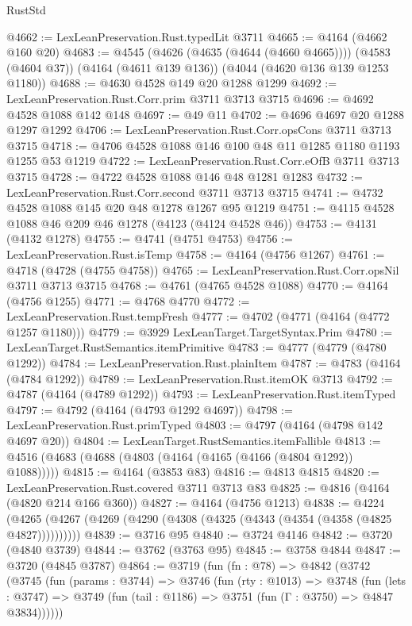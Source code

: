 \begin{lexlean}{RustStd}
\begin{coremodule}
@4662 := LexLeanPreservation.Rust.typedLit @3711
@4665 := @4164 (@4662 @160 @20)
@4683 := @4545
    (@4626 (@4635 (@4644 (@4660 @4665))))
    (@4583 (@4604 @37))
    (@4164 (@4611 @139 @136))
    (@4044 (@4620 @136 @139 @1253 @1180))
@4688 := @4630 @4528 @149 @20 @1288 @1299
@4692 := LexLeanPreservation.Rust.Corr.prim @3711 @3713 @3715
@4696 := @4692 @4528 @1088 @142 @148
@4697 := @49 @11
@4702 := @4696 @4697 @20 @1288 @1297 @1292
@4706 := LexLeanPreservation.Rust.Corr.opsCons @3711 @3713 @3715
@4718 := @4706 @4528 @1088 @146 @100 @48 @11 @1285 @1180 @1193 @1255 @53 @1219
@4722 := LexLeanPreservation.Rust.Corr.eOfB @3711 @3713 @3715
@4728 := @4722 @4528 @1088 @146 @48 @1281 @1283
@4732 := LexLeanPreservation.Rust.Corr.second @3711 @3713 @3715
@4741 := @4732 @4528 @1088 @145 @20 @48 @1278 @1267 @95 @1219
@4751 := @4115 @4528 @1088 @46 @209 @46 @1278 (@4123 (@4124 @4528 @46))
@4753 := @4131 (@4132 @1278)
@4755 := @4741 (@4751 @4753)
@4756 := LexLeanPreservation.Rust.isTemp
@4758 := @4164 (@4756 @1267)
@4761 := @4718 (@4728 (@4755 @4758))
@4765 := LexLeanPreservation.Rust.Corr.opsNil @3711 @3713 @3715
@4768 := @4761 (@4765 @4528 @1088)
@4770 := @4164 (@4756 @1255)
@4771 := @4768 @4770
@4772 := LexLeanPreservation.Rust.tempFresh
@4777 := @4702 (@4771 (@4164 (@4772 @1257 @1180)))
@4779 := @3929 LexLeanTarget.TargetSyntax.Prim
@4780 := LexLeanTarget.RustSemantics.itemPrimitive
@4783 := @4777 (@4779 (@4780 @1292))
@4784 := LexLeanPreservation.Rust.plainItem
@4787 := @4783 (@4164 (@4784 @1292))
@4789 := LexLeanPreservation.Rust.itemOK @3713
@4792 := @4787 (@4164 (@4789 @1292))
@4793 := LexLeanPreservation.Rust.itemTyped
@4797 := @4792 (@4164 (@4793 @1292 @4697))
@4798 := LexLeanPreservation.Rust.primTyped
@4803 := @4797 (@4164 (@4798 @142 @4697 @20))
@4804 := LexLeanTarget.RustSemantics.itemFallible
@4813 := @4516 (@4683 (@4688 (@4803 (@4164 (@4165 (@4166 (@4804 @1292)) @1088)))))
@4815 := @4164 (@3853 @83)
@4816 := @4813 @4815
@4820 := LexLeanPreservation.Rust.covered @3711 @3713 @83
@4825 := @4816 (@4164 (@4820 @214 @166 @360))
@4827 := @4164 (@4756 @1213)
@4838 := @4224 (@4265 (@4267 (@4269 (@4290 (@4308 (@4325 (@4343 (@4354 (@4358 (@4825 @4827))))))))))
@4839 := @3716 @95
@4840 := @3724 @4146
@4842 := @3720 (@4840 @3739)
@4844 := @3762 (@3763 @95)
@4845 := @3758 @4844
@4847 := @3720 (@4845 @3787)
@4864 := @3719
    (fun (fn : @78) =>
    @4842
      (@3742
        (@3745
          (fun (params : @3744) =>
          @3746
            (fun (rty : @1013) =>
            @3748
              (fun (lets : @3747) =>
              @3749 (fun (tail : @1186) => @3751 (fun (Γ : @3750) => @4847 @3834))))))

\end{coremodule}
\end{lexlean}
